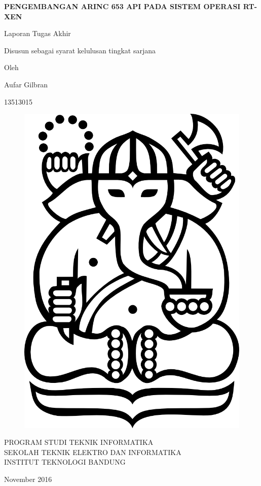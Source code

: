 \clearpage
\pagestyle{empty}

\begin{center}
\smallskip

    \Large \bfseries \MakeUppercase{Pengembangan ARINC 653 API pada Sistem Operasi RT-Xen}
    \vfill

    \Large Laporan Tugas Akhir
    \vfill

    \large Disusun sebagai syarat kelulusan tingkat sarjana
    \vfill

    \large Oleh

    \Large Aufar Gilbran

    \Large 13513015

    \vfill
    \begin{figure}[h]
        \centering
        \includegraphics[scale=0.15]{resources/cover-ganesha}
    \end{figure}
    \vfill

    \large
    \uppercase{
        Program Studi Teknik Informatika \\
        Sekolah Teknik Elektro dan Informatika \\
        Institut Teknologi Bandung
    }

    November 2016

\end{center}

\clearpage
